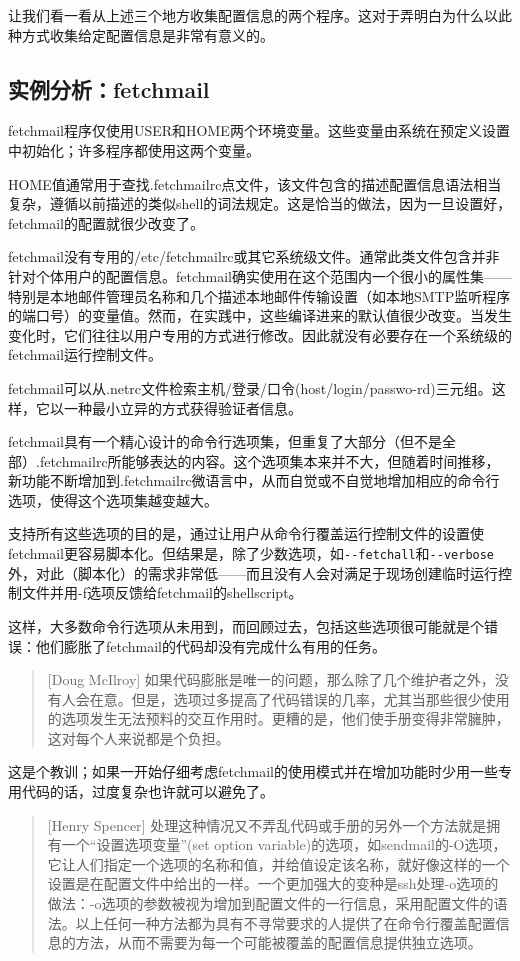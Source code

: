 \documentclass[12pt,oneside]{book}
\begin{document}
让我们看一看从上述三个地方收集配置信息的两个程序。这对于弄明白为什么以此种方式收集给定配置信息是非常有意义的。

\subsection{实例分析：fetchmail}
fetchmail程序仅使用USER和HOME两个环境变量。这些变量由系统在预定义设置中初始化；许多程序都使用这两个变量。

HOME值通常用于查找.fetchmailrc点文件，该文件包含的描述配置信息语法相当复杂，遵循以前描述的类似shell的词法规定。这是恰当的做法，因为一旦设置好，fetchmail的配置就很少改变了。

fetchmail没有专用的/etc/fetchmailrc或其它系统级文件。通常此类文件包含并非针对个体用户的配置信息。fetchmail确实使用在这个范围内一个很小的属性集——特别是本地邮件管理员名称和几个描述本地邮件传输设置（如本地SMTP监听程序的端口号）的变量值。然而，在实践中，这些编译进来的默认值很少改变。当发生变化时，它们往往以用户专用的方式进行修改。因此就没有必要存在一个系统级的fetchmail运行控制文件。

fetchmail可以从.netrc文件检索主机/登录/口令(host/login/passwo-rd)三元组。这样，它以一种最小立异的方式获得验证者信息。

fetchmail具有一个精心设计的命令行选项集，但重复了大部分（但不是全部）.fetchmailrc所能够表达的内容。这个选项集本来并不大，但随着时间推移，新功能不断增加到.fetchmailrc微语言中，从而自觉或不自觉地增加相应的命令行选项，使得这个选项集越变越大。

支持所有这些选项的目的是，通过让用户从命令行覆盖运行控制文件的设置使fetchmail更容易脚本化。但结果是，除了少数选项，如\verb+--fetchall+和\verb+--verbose+外，对此（脚本化）的需求非常低——而且没有人会对满足于现场创建临时运行控制文件并用-f选项反馈给fetchmail的shellscript。

这样，大多数命令行选项从未用到，而回顾过去，包括这些选项很可能就是个错误：他们膨胀了fetchmail的代码却没有完成什么有用的任务。

\begin{quote}[Doug McIlroy]
如果代码膨胀是唯一的问题，那么除了几个维护者之外，没有人会在意。但是，选项过多提高了代码错误的几率，尤其当那些很少使用的选项发生无法预料的交互作用时。更糟的是，他们使手册变得非常臃肿，这对每个人来说都是个负担。
\end{quote}

这是个教训；如果一开始仔细考虑fetchmail的使用模式并在增加功能时少用一些专用代码的话，过度复杂也许就可以避免了。

\begin{quote}[Henry Spencer]
处理这种情况又不弄乱代码或手册的另外一个方法就是拥有一个“设置选项变量”(set option variable)的选项，如sendmail的-O选项，它让人们指定一个选项的名称和值，并给值设定该名称，就好像这样的一个设置是在配置文件中给出的一样。一个更加强大的变种是ssh处理-o选项的做法：-o选项的参数被视为增加到配置文件的一行信息，采用配置文件的语法。以上任何一种方法都为具有不寻常要求的人提供了在命令行覆盖配置信息的方法，从而不需要为每一个可能被覆盖的配置信息提供独立选项。
\end{quote}
\end{document}
